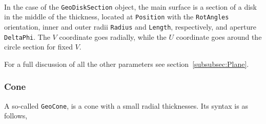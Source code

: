 ~\\
In the case of the {\tt GeoDiskSection} object, the main surface is a section of a disk in the middle of the thickness, located at {\tt Position} with 
the {\tt RotAngles} orientation, inner and outer radii {\tt Radius} and {\tt Length}, respectively, and aperture {\tt DeltaPhi}. 
The $V$ coordinate goes radially, while the $U$ coordinate goes around the circle section for fixed $V$.

For a full discussion of all the other parameters see section~\ref{subsubsec:Plane}.

\subsubsection{Cone}

A so-called {\tt GeoCone}, is a cone with a small radial thicknesses. Its syntax is as follows,

